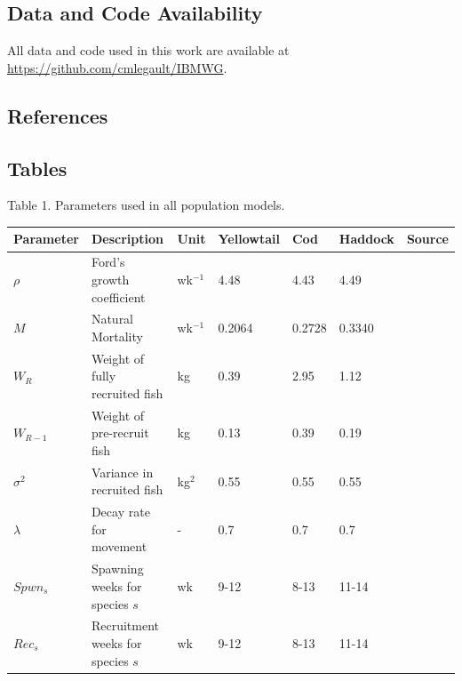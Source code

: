 \documentclass[
]{article}
\newlength{\cslhangindent}
\newlength{\cslentryspacingunit} %
\newenvironment{CSLReferences}[2] %
 {%
  \setlength{\parindent}{0pt}
  \ifodd #1
  \let\oldpar\par
  \def\par{\hangindent=\cslhangindent\oldpar}
  \fi
  \setlength{\parskip}{#2\cslentryspacingunit}
 }%
 {}
\begin{document}
\hypertarget{data-and-code-availability}{%
\subsection{Data and Code Availability}\label{data-and-code-availability}}

All data and code used in this work are available at \url{https://github.com/cmlegault/IBMWG}.

\hypertarget{references}{%
\subsection{References}\label{references}}

\hypertarget{refs}{}
\begin{CSLReferences}{0}{0}
\end{CSLReferences}

\pagebreak

\hypertarget{tables}{%
\subsection{Tables}\label{tables}}

\pagebreak

Table 1. Parameters used in all population models.

\begin{longtable}[]{@{}lllllll@{}}
\toprule
Parameter & Description & Unit & Yellowtail & Cod & Haddock & Source \\
\midrule
\endhead
\(\rho\) & Ford's growth coefficient & wk\(^{-1}\) & 4.48 & 4.43 & 4.49 & \\
\(M\) & Natural Mortality & wk\(^{-1}\) & 0.2064 & 0.2728 & 0.3340 & \\
\(W_R\) & Weight of fully recruited fish & kg & 0.39 & 2.95 & 1.12 & \\
\(W_{R-1}\) & Weight of pre-recruit fish & kg & 0.13 & 0.39 & 0.19 & \\
\(\sigma^2\) & Variance in recruited fish & kg\(^2\) & 0.55 & 0.55 & 0.55 & \\
\(\lambda\) & Decay rate for movement & - & 0.7 & 0.7 & 0.7 & \\
\(Spwn_s\) & Spawning weeks for species \(s\) & wk & 9-12 & 8-13 & 11-14 & \\
\(Rec_s\) & Recruitment weeks for species \(s\) & wk & 9-12 & 8-13 & 11-14 & \\
\bottomrule
\end{longtable}
\end{document}
